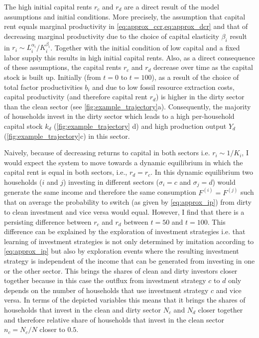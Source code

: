 The high initial capital rents $r_c$ and $r_d$ are a direct result of the model assumptions and initial conditions. More precisely, the assumption that capital rent equals marginal productivity in 
\cref{eq:approx_ccr,eq:approx_dcr}
and that of decreasing marginal productivity due to the choice of capital elasticity $\beta_i$  result in $r_i \sim L_i^{\alpha_i}/K_i^{\beta_i}$. Together with the initial condition of low capital and a fixed labor supply this results in high initial capital rents. Also, as a direct consequence of these assumptions, the capital rents $r_c$ and $r_d$ decrease over time as the capital stock is built up.
Initially (from $t=0$ to $t=100$), as a result of the choice of total factor productivities $b_i$ and due to low fossil resource extraction costs, capital productivity (and therefore capital rent $r_d$) is higher in the dirty sector than the clean sector (see \cref{fig:example_trajectory}a). 
Consequently, the majority of households invest in the dirty sector which leads to a high per-household capital stock $k_d$ (\cref{fig:example_trajectory} d) and high production output $Y_d$ (\cref{fig:example_trajectory}c) in this sector.

Naively, because of decreasing returns to capital in both sectors i.e. $r_i \sim 1/K_i$, I would expect the system to move towards a dynamic equilibrium in which the capital rent is equal in both sectors, i.e., $r_d = r_c$. In this dynamic equilibrium two households
($i$ and $j$) investing in different sectors ($\sigma_i=c$ and $\sigma_j=d$) would generate the same income and therefore the same consumption $F^{(i)}=F^{(j)}$ such that on average the probability to switch (as given by \cref{eq:approx_ip}) from dirty to clean investment and vice versa would equal. However, I find that there is a persisting difference between $r_c$ and $r_d$ between $t=50$ and $t=100$.
This difference can be explained by the exploration of investment strategies i.e. that learning of investment strategies is not only determined by imitation according to \cref{eq:approx_ip} but also by exploration events where the resulting investment strategy is independent of the income that can be generated from investing in one or the other sector. This brings the shares of clean and dirty investors closer together because in this case the outflux from investment strategy $c$ to $d$ only depends on the number of households that use investment strategy $c$ and vice versa. In terms of the depicted variables this means that it brings the shares of households that invest in the clean and dirty sector $N_c$ and $N_d$ closer together and therefore relative share of households that invest in the clean sector $n_c=N_c/N$ closer to $0.5$. 

